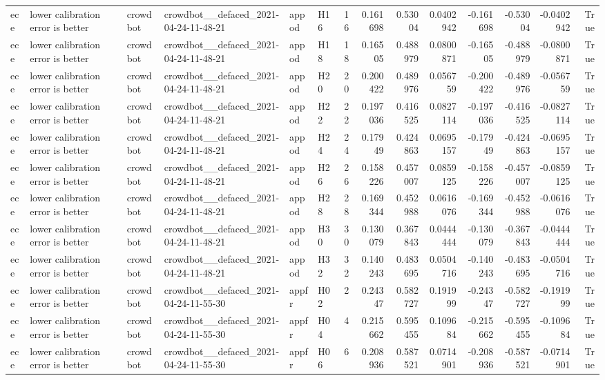 \begin{longtable}{llllllrrrrrrrr}
ece & lower calibration error is better & crowdbot & crowdbot\_\_defaced\_2021-04-24-11-48-21 & appod & H16 & 16 & 0.161698 & 0.53004 & 0.0402942 & -0.161698 & -0.53004 & -0.0402942 & True \\
ece & lower calibration error is better & crowdbot & crowdbot\_\_defaced\_2021-04-24-11-48-21 & appod & H18 & 18 & 0.16505 & 0.488979 & 0.0800871 & -0.16505 & -0.488979 & -0.0800871 & True \\
ece & lower calibration error is better & crowdbot & crowdbot\_\_defaced\_2021-04-24-11-48-21 & appod & H20 & 20 & 0.200422 & 0.489976 & 0.056759 & -0.200422 & -0.489976 & -0.056759 & True \\
ece & lower calibration error is better & crowdbot & crowdbot\_\_defaced\_2021-04-24-11-48-21 & appod & H22 & 22 & 0.197036 & 0.416525 & 0.0827114 & -0.197036 & -0.416525 & -0.0827114 & True \\
ece & lower calibration error is better & crowdbot & crowdbot\_\_defaced\_2021-04-24-11-48-21 & appod & H24 & 24 & 0.17949 & 0.424863 & 0.0695157 & -0.17949 & -0.424863 & -0.0695157 & True \\
ece & lower calibration error is better & crowdbot & crowdbot\_\_defaced\_2021-04-24-11-48-21 & appod & H26 & 26 & 0.158226 & 0.457007 & 0.0859125 & -0.158226 & -0.457007 & -0.0859125 & True \\
ece & lower calibration error is better & crowdbot & crowdbot\_\_defaced\_2021-04-24-11-48-21 & appod & H28 & 28 & 0.169344 & 0.452988 & 0.0616076 & -0.169344 & -0.452988 & -0.0616076 & True \\
ece & lower calibration error is better & crowdbot & crowdbot\_\_defaced\_2021-04-24-11-48-21 & appod & H30 & 30 & 0.130079 & 0.367843 & 0.0444444 & -0.130079 & -0.367843 & -0.0444444 & True \\
ece & lower calibration error is better & crowdbot & crowdbot\_\_defaced\_2021-04-24-11-48-21 & appod & H32 & 32 & 0.140243 & 0.483695 & 0.0504716 & -0.140243 & -0.483695 & -0.0504716 & True \\
ece & lower calibration error is better & crowdbot & crowdbot\_\_defaced\_2021-04-24-11-55-30 & appfr & H02 & 2 & 0.24347 & 0.582727 & 0.191999 & -0.24347 & -0.582727 & -0.191999 & True \\
ece & lower calibration error is better & crowdbot & crowdbot\_\_defaced\_2021-04-24-11-55-30 & appfr & H04 & 4 & 0.215662 & 0.595455 & 0.109684 & -0.215662 & -0.595455 & -0.109684 & True \\
ece & lower calibration error is better & crowdbot & crowdbot\_\_defaced\_2021-04-24-11-55-30 & appfr & H06 & 6 & 0.208936 & 0.587521 & 0.0714901 & -0.208936 & -0.587521 & -0.0714901 & True \\

\end{longtable}
